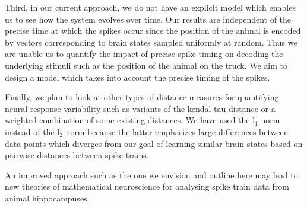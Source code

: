 Third, in our current approach, we do not have an explicit model which enables
us to see how the system evolves over time.
Our results are independent of the precise time at which the spikes occur since the position of the animal is encoded by vectors corresponding to brain states
sampled uniformly at random. Thus we are unable us to quantify the impact of precise spike timing on decoding the underlying stimuli such as the position
of the animal on the truck. We aim to design a model which takes into account the precise timing of the spikes. 

Finally, we plan to look at other types of distance measures for quantifying neural response variability such as variants of the kendal tau distance 
or a weighted combination of some existing distances. We have used the l$_1$
norm instead of the l$_{2}$ norm because the latter emphasizes large differences between data points which diverges from our goal of learning similar brain states 
based on pairwise distances between spike trains.


An improved approach such as the one we envision and outline here 
may lead to new theories of mathematical neuroscience for analysing spike train data from animal hippocampuses.















